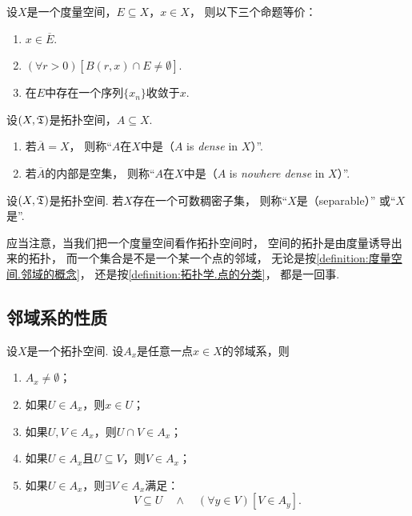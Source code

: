 \begin{theorem}
设\(X\)是一个度量空间，\(E \subseteq X\)，\(x \in X\)，
则以下三个命题等价：\begin{enumerate}
	\item \(x \in \overline{E}\).
	\item \((\forall r>0)[B(r,x) \cap E \neq \emptyset]\).
	\item 在\(E\)中存在一个序列\(\{x_n\}\)收敛于\(x\).
\end{enumerate}
\end{theorem}

\begin{definition}
设\((X,\mathfrak T)\)是拓扑空间，\(A \subseteq X\).
\begin{enumerate}
	\item 若\(\overline{A}=X\)，
	则称“\(A\)在\(X\)中是（\(A\) is \emph{dense} in \(X\)）”.
	\item 若\(\overline{A}\)的内部是空集，
	则称“\(A\)在\(X\)中是（\(A\) is \emph{nowhere dense} in \(X\)）”.
\end{enumerate}
\end{definition}

\begin{definition}
设\((X,\mathfrak T)\)是拓扑空间.
若\(X\)存在一个可数稠密子集，
则称“\(X\)是（separable）”
或“\(X\)是”.
\end{definition}

\begin{remark}
应当注意，当我们把一个度量空间看作拓扑空间时，
空间的拓扑是由度量诱导出来的拓扑，
而一个集合是不是一个某一个点的邻域，
无论是按\cref{definition:度量空间.邻域的概念}，
还是按\cref{definition:拓扑学.点的分类}，
都是一回事.
\end{remark}

\subsection{邻域系的性质}
\begin{theorem}\label{theorem:拓扑学.邻域系的基本性质}
设\(X\)是一个拓扑空间.
设\(A_x\)是任意一点\(x \in X\)的邻域系，则
\begin{enumerate}
	\item \(A_x \neq \emptyset\)；
	\item 如果\(U \in A_x\)，则\(x \in U\)；
	\item 如果\(U,V \in A_x\)，则\(U \cap V \in A_x\)；
	\item 如果\(U \in A_x\)且\(U \subseteq V\)，则\(V \in A_x\)；
	\item 如果\(U \in A_x\)，则\(\exists V \in A_x\)满足：\[
		V \subseteq U
		\quad\land\quad
		(\forall y \in V)
		[V \in A_y].
	\]
\end{enumerate}
\end{theorem}

